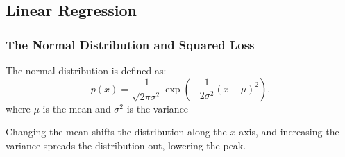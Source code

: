 \documentclass[]{article}
\begin{document}
\subsection{Linear Regression}
\setcounter{subsubsection}{2}
\subsubsection{The Normal Distribution and Squared Loss}

The normal distribution is defined as:
\begin{equation}
    p(x) = \frac{1}{\sqrt{2 \pi \sigma^2}} \exp\left(-\frac{1}{2 \sigma^2} (x - \mu)^2\right).
    \tag{3.1.12}
\end{equation}
where $\mu$ is the mean and $\sigma^2$ is the variance

Changing the mean shifts the distribution along the $x$-axis, and increasing the
variance spreads the distribution out, lowering the peak.

\end{document}

